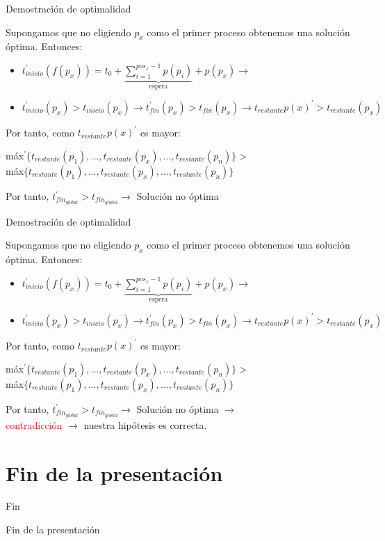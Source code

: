\documentclass{beamer}
\begin{document}
\begin{frame}[fragile]{Demostración de optimalidad}

Supongamos que no eligiendo $p_x$ como el primer proceso obtenemos una solución óptima. Entonces:
\begin{itemize}
\item $t_{inicio}^{\prime}(f(p_x))= t_0 + 
\underbrace{\sum^{pos_x-1}_{i=1} p(p_i)}_{\text{espera}} + p(p_x) \rightarrow $

\item $t_{inicio}^{\prime}(p_x) > t_{inicio}(p_x) \rightarrow 
	t_{fin}^{\prime}(p_x) > t_{fin}(p_x) \rightarrow t_{restante}p(x)^{\prime} > t_{restante}(p_x)$
\end{itemize}

Por tanto, como $t_{restante}p(x)^{\prime}$ es mayor:
\begin{center}
máx$^{\prime}\{t_{restante}(p_1),...,t_{restante}(p_x),...,t_{restante}(p_n)\} > $ \\máx$\{t_{restante}(p_1),...,t_{restante}(p_x),...,t_{restante}(p_n)\}$
\end{center}
Por tanto, $t_{fin_{global}}^{\prime}> t_{fin_{global}} \rightarrow $ Solución no óptima
\end{frame}

\begin{frame}[fragile]{Demostración de optimalidad}

Supongamos que no eligiendo $p_x$ como el primer proceso obtenemos una solución óptima. Entonces:
\begin{itemize}
\item $t_{inicio}^{\prime}(f(p_x))= t_0 + 
\underbrace{\sum^{pos_x-1}_{i=1} p(p_i)}_{\text{espera}} + p(p_x) \rightarrow $

\item $t_{inicio}^{\prime}(p_x) > t_{inicio}(p_x) \rightarrow 
	t_{fin}^{\prime}(p_x) > t_{fin}(p_x) \rightarrow t_{restante}p(x)^{\prime} > t_{restante}(p_x)$
\end{itemize}

Por tanto, como $t_{restante}p(x)^{\prime}$ es mayor:
\begin{center}
máx$^{\prime}\{t_{restante}(p_1),...,t_{restante}(p_x),...,t_{restante}(p_n)\} > $ \\máx$\{t_{restante}(p_1),...,t_{restante}(p_x),...,t_{restante}(p_n)\}$
\end{center}
Por tanto, $t_{fin_{global}}^{\prime}> t_{fin_{global}} \rightarrow $ Solución no óptima $\rightarrow$\\ \textcolor{red}{contradicción} $\rightarrow$ nuestra hipótesis es correcta.
\end{frame}


\section*{Fin de la presentación}

\begin{frame}{Fin}
\begin{center}
\huge{Fin de la presentación}
\end{center}
\end{frame}
\end{document}
